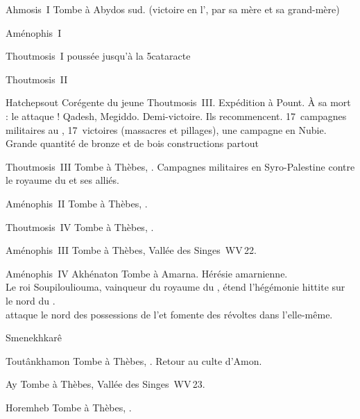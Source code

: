 \begin{listerois}
  \item [Ahmosis~I\ier \datation{(c.~\anorange{1550}{1525})}] 
        Tombe à Abydos sud.
        (victoire en l', par sa mère et sa grand-mère)
  \item [Aménophis~I\ier \datation{(c.~\anorange{1525}{1504})}]
  \item [Thoutmosis~I\ier \datation{(c.~\anorange{1504}{1492})}] 
        poussée jusqu'à la 5\ieme cataracte
  \item [Thoutmosis~II \datation{(c.~\anorange{1492}{1479})}]
  \item [Hatchepsout \datation{(c.~\anorange{1479}{1458})}] 
        Corégente du jeune Thoutmosis~III. Expédition à Pount.
        À sa mort : le \Mtn attaque ! \donc{} Qadesh, Megiddo.
        Demi-victoire.
        Ils recommencent.
        \num{17}~campagnes militaires au \PO, \num{17}~victoires 
        (massacres et pillages), une campagne en Nubie.
        Grande quantité de bronze et de bois \donc{} constructions 
        partout
  \item [Thoutmosis~III \datation{(c.~\anorange{1479}{1425})}] 
        Tombe à Thèbes, . Campagnes militaires 
        en Syro-Palestine contre le royaume du \Mtn et ses alliés.
  \item [Aménophis~II \datation{(c.~\anorange{1425}{1397})}] 
        Tombe à Thèbes, .
  \item [Thoutmosis~IV \datation{(c.~\anorange{1397}{1388})}] 
        Tombe à Thèbes, .
  \item [Aménophis~III \datation{(c.~\anorange{1388}{1350})}] 
        Tombe à Thèbes, Vallée des Singes~WV\,22.
  \item [Aménophis~IV Akhénaton \datation{(c.~\anorange{1350}{1334})}] 
        Tombe à Amarna. Hérésie amarnienne. \\
        Le roi Soupilouliouma, vainqueur du royaume du \Mtn, 
        étend l'hégémonie hittite sur le nord du \PO. \\
        attaque le nord des possessions de l'\kmt et fomente des 
        révoltes dans l'\kmt elle-même.
  \item [Smenekhkarê \datation{(c.~\anorange{1337}{1333})}]
  \item [Toutânkhamon \datation{(c.~\anorange{1333}{1323})}] 
        Tombe à Thèbes, . Retour au culte d'Amon.
  \item [Ay \datation{(c.~\anorange{1323}{1319})}] 
        Tombe à Thèbes, Vallée des Singes~WV\,23.
  \item [Horemheb \datation{(c.~\anorange{1319}{1292})}] 
        Tombe à Thèbes, .
\end{listerois}


